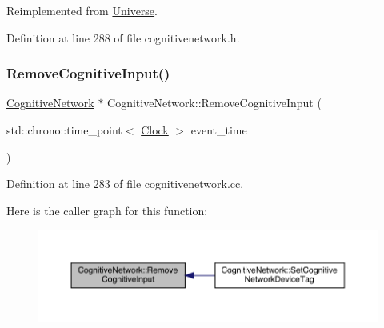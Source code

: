 Reimplemented from \hyperlink{class_universe_a0c485c504542409cbb5cfd8543c35b11}{Universe}.



Definition at line 288 of file cognitivenetwork.\+h.

\mbox{\label{class_cognitive_network_af79bf7f8b61d5392df7a87bd444eb550}} 
\subsubsection{\texorpdfstring{Remove\+Cognitive\+Input()}{RemoveCognitiveInput()}}
{\footnotesize\ttfamily \hyperlink{class_cognitive_network}{Cognitive\+Network} $\ast$ Cognitive\+Network\+::\+Remove\+Cognitive\+Input (\begin{DoxyParamCaption}\item[{std\+::chrono\+::time\+\_\+point$<$ \hyperlink{universe_8h_a0ef8d951d1ca5ab3cfaf7ab4c7a6fd80}{Clock} $>$}]{event\+\_\+time }\end{DoxyParamCaption})}



Definition at line 283 of file cognitivenetwork.\+cc.

Here is the caller graph for this function\+:
\nopagebreak
\begin{figure}[H]
\begin{center}
\leavevmode
\includegraphics[width=350pt]{class_cognitive_network_af79bf7f8b61d5392df7a87bd444eb550_icgraph}
\end{center}
\end{figure}
\mbox{\label{class_cognitive_network_aaaf93e7c732b1e1e81060f82ff73c93a}} 
